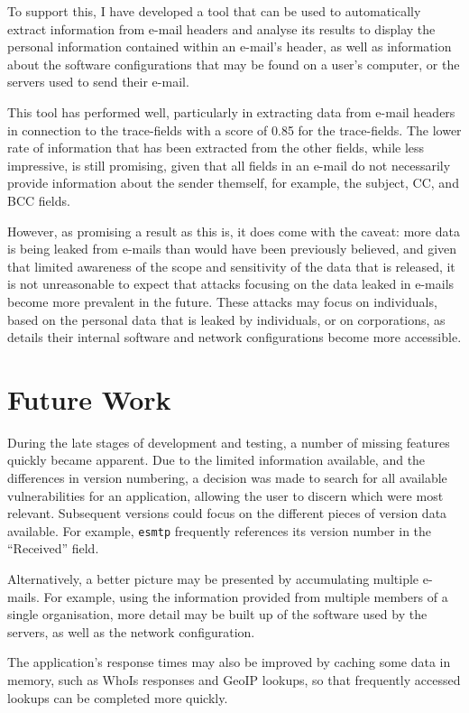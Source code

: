 To support this, I have developed a tool that can be used to automatically
extract information from e-mail headers and analyse its results to display the
personal information contained within an e-mail's header, as well as
information about the software configurations that may be found on a user's
computer, or the servers used to send their e-mail.

This tool has performed well, particularly in extracting data from e-mail
headers in connection to the trace-fields with a score of 0.85 for the
trace-fields.  The lower rate of information that has been extracted from
the other fields, while less impressive, is still promising, given that all
fields in an e-mail do not necessarily provide information about the sender
themself, for example, the subject, CC, and BCC fields.

However, as promising a result as this is, it does come with the caveat: more
data is being leaked from e-mails than would have been previously believed, and
given that limited awareness of the scope and sensitivity of the data that is
released, it is not unreasonable to expect that attacks focusing on the data
leaked in e-mails become more prevalent in the future.  These attacks may focus
on individuals, based on the personal data that is leaked by individuals, or on
corporations, as details their internal software and network configurations
become more accessible.

\section{Future Work}

During the late stages of development and testing, a number of missing features
quickly became apparent. Due to the limited information available, and the
differences in version numbering, a decision was made to search for all
available vulnerabilities for an application, allowing the user to discern
which were most relevant.  Subsequent versions could focus on the different
pieces of version data available.  For example, \texttt{esmtp} frequently
references its version number in the ``Received'' field.

Alternatively, a better picture may be presented by accumulating multiple
e-mails. For example, using the information provided from multiple members of
a single organisation, more detail may be built up of the software used by
the servers, as well as the network configuration.

The application's response times may also be improved by caching some data in
memory, such as WhoIs responses and GeoIP lookups, so that frequently accessed
lookups can be completed more quickly.

